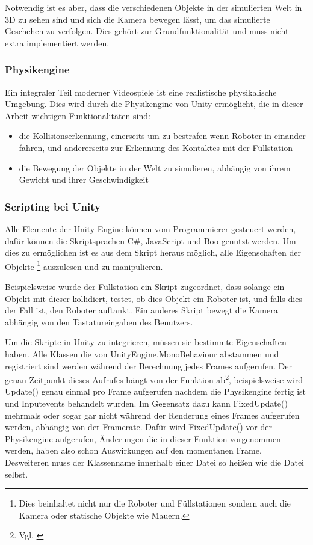 Notwendig ist es aber, dass die verschiedenen Objekte in der simulierten Welt in 3D zu sehen sind und sich die Kamera bewegen l{\"{a}}sst, um das simulierte Geschehen zu
verfolgen. Dies geh{\"{o}}rt zur Grundfunktionalit{\"{a}}t und muss nicht extra implementiert werden.

\subsubsection{Physikengine}
Ein integraler Teil moderner Videospiele ist eine realistische physikalische Umgebung. Dies wird durch die Physikengine von Unity erm{\"{o}}glicht, die in dieser Arbeit wichtigen Funktionalit{\"{a}}ten sind:

\begin{itemize}
\item die Kollisionserkennung, einerseits um zu bestrafen wenn Roboter in einander fahren,
	und andererseits zur Erkennung des Kontaktes mit der F{\"{u}}llstation
\item die Bewegung der Objekte in der Welt zu simulieren, abh{\"{a}}ngig von ihrem Gewicht und ihrer Geschwindigkeit
\end{itemize}

\subsubsection{Scripting bei Unity}
Alle Elemente der Unity Engine k{\"{o}}nnen vom Programmierer gesteuert werden, daf{\"{u}}r k{\"{o}}nnen
die Skriptsprachen C\#, JavaScript und Boo genutzt werden.\cite{wiki:unity}
Um dies zu erm{\"{o}}glichen ist es aus dem Skript heraus m{\"{o}}glich, alle Eigenschaften
der Objekte \footnote{Dies beinhaltet nicht nur die Roboter und F{\"{u}}llstationen sondern auch die Kamera
oder statische Objekte wie Mauern.} auszulesen und zu manipulieren.

Beispielsweise wurde der F{\"{u}}llstation ein Skript zugeordnet, dass solange ein Objekt mit dieser kollidiert, testet, ob dies Objekt ein Roboter ist, und falls dies der Fall ist,
den Roboter auftankt. Ein anderes Skript bewegt die Kamera abh{\"{a}}ngig von den Tastatureingaben des Benutzers.

Um die Skripte in Unity zu integrieren, m{\"{u}}ssen sie bestimmte Eigenschaften haben. Alle Klassen die von UnityEngine.MonoBehaviour
abstammen und registriert sind werden w{\"{a}}hrend der Berechnung jedes Frames aufgerufen. Der genau Zeitpunkt dieses Aufrufes h{\"{a}}ngt von
der Funktion ab\footnote{Vgl. \cite{unity-exec-order}}, beispielsweise wird Update() genau einmal pro Frame aufgerufen nachdem die Physikengine fertig ist
und Inputevents behandelt wurden. Im Gegensatz dazu kann FixedUpdate() mehrmals oder sogar gar nicht w{\"{a}}hrend der Renderung eines Frames aufgerufen
werden, abh{\"{a}}ngig von der Framerate. Daf{\"{u}}r wird FixedUpdate() vor der Physikengine aufgerufen, {\"{A}}nderungen die in dieser
Funktion vorgenommen werden, haben also schon Auswirkungen auf den momentanen Frame. Desweiteren muss der Klassenname innerhalb einer Datei so
hei{\ss}en wie die Datei selbst.

